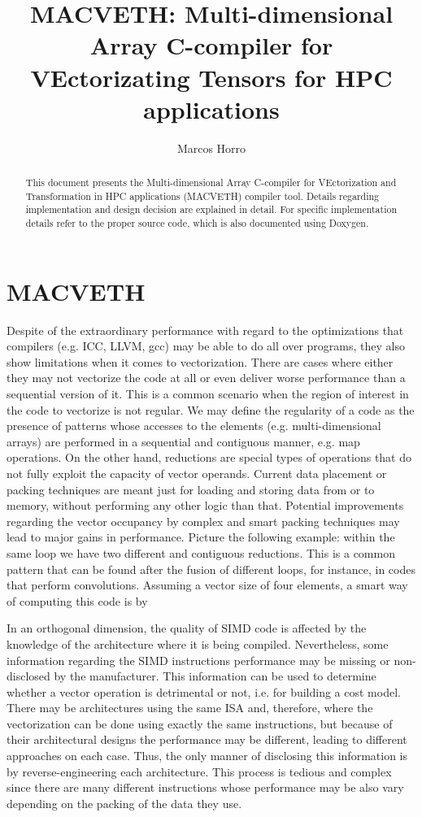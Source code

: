 \documentclass[a4paper,12pt]{memoir}
\title{\textbf{MACVETH}: \textbf{M}ulti-dimensional \textbf{A}rray
    \textbf{C}-compiler for \textbf{VE}ctorizating
    \textbf{T}ensors for \textbf{H}PC applications}
\author{Marcos Horro}
\date{}
\begin{document}
\maketitle

\begin{abstract}
	This document presents the Multi-dimensional Array C-compiler for VEctorization
	and Transformation in HPC applications (MACVETH) compiler tool. Details
	regarding implementation and design decision are explained in detail. For
	specific implementation details refer to the proper source code, which is also
	documented using Doxygen.
\end{abstract}

\chapter{MACVETH}

Despite of the extraordinary performance with regard to the optimizations that compilers (e.g. ICC, LLVM, gcc) may be able to do all over programs, they also show limitations when it comes to vectorization. There are cases where either they may not vectorize the code at all or even deliver worse performance than a sequential version of it. This is a common scenario when the region of interest in the code to vectorize is not regular. We may define the regularity of a code as the presence of patterns whose accesses to the elements (e.g. multi-dimensional arrays) are performed in a sequential and contiguous manner, e.g. map operations. On the other hand, reductions are special types of operations that do not fully exploit the capacity of vector operands. Current data placement or packing techniques are meant just for loading and storing data from or to memory, without performing any other logic than that. Potential improvements regarding the vector occupancy by complex and smart packing techniques may lead to major gains in performance. Picture the following example: within the same loop we have two different and contiguous reductions. This is a common pattern that can be found after the fusion of different loops, for instance, in codes that perform convolutions. Assuming a vector size of four elements, a smart way of computing this code is by

In an orthogonal dimension, the quality of SIMD code is affected by the knowledge of the architecture where it is being compiled. Nevertheless, some information regarding the SIMD instructions performance may be missing or non-disclosed by the manufacturer. This information can be used to determine whether a vector operation is detrimental or not, i.e. for building a cost model. There may be architectures using the same ISA and, therefore, where the vectorization can be done using exactly the same instructions, but because of their architectural designs the performance may be different, leading to different approaches on each case. Thus, the only manner of disclosing this information is by reverse-engineering each architecture. This process is tedious and complex since there are many different instructions whose performance may be also vary depending on the packing of the data they use.
\end{document}
